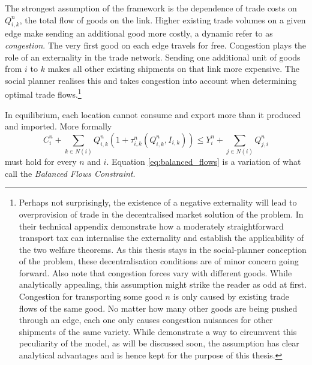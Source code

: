 \documentclass[11pt, oneside]{article}   	%
\begin{document}
The strongest assumption of the \citeauthor{fajgelbaum_optimal_2017} framework is the dependence of trade costs on $Q_{i,k}^{n}$, the total flow of goods on the link. Higher existing trade volumes on a given edge make sending an additional good more costly, a dynamic \citeauthor{fajgelbaum_optimal_2017} refer to as \emph{congestion}. The very first good on each edge travels for free. Congestion plays the role of an externality in the trade network. Sending one additional unit of goods from $i$ to $k$ makes all other existing shipments on that link more expensive. The social planner realises this and takes congestion into account when determining optimal trade flows.\footnote{Perhaps not surprisingly, the existence of a negative externality will lead to overprovision of trade in the decentralised market solution of the problem. In their technical appendix \citeauthor{fajgelbaum_optimal_2017} demonstrate how a moderately straightforward transport tax can internalise the externality and establish the applicability of the two welfare theorems. As this thesis stays in the social-planner conception of the problem, these decentralisation conditions are of minor concern going forward. Also note that congestion forces vary with different goods. While analytically appealing, this assumption might strike the reader as odd at first. Congestion for transporting some good $n$ is only caused by existing trade flows of the same good. No matter how many other goods are being pushed through an edge, each one only causes congestion nuisances for other shipments of the same variety. While \citeauthor{fajgelbaum_optimal_2017} demonstrate a way to circumvent this peculiarity of the model, as will be discussed soon, the assumption has clear analytical advantages and is hence kept for the purpose of this thesis.}

In equilibrium, each location cannot consume and export more than it produced and imported. More formally
\begin{equation}
  C_{i}^{n} + \sum_{k\in N(i)}^{}Q_{i,k}^{n}(1+\tau_{i,k}^{n}(Q_{i,k}^{n}, I_{i,k})) \leq Y_{i}^{n} + \sum_{j\in N(i)}^{}Q_{j,i}^{n}
  \label{eq:balanced_flows}
\end{equation}
must hold for every $n$ and $i$. Equation \eqref{eq:balanced_flows} is a variation of what \citeauthor{fajgelbaum_optimal_2017} call the \emph{Balanced Flows Constraint}.
\end{document}
